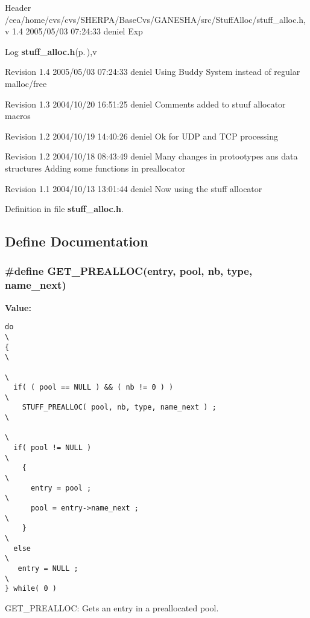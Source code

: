 \begin{Desc}
\item[Header]/cea/home/cvs/cvs/SHERPA/Base\-Cvs/GANESHA/src/Stuff\-Alloc/stuff\_\-alloc.h,v 1.4 2005/05/03 07:24:33 deniel Exp \end{Desc}


\begin{Desc}
\item[Log]{\bf stuff\_\-alloc.h}{\rm (p.\,\pageref{stuff__alloc_8h})},v \end{Desc}
Revision 1.4 2005/05/03 07:24:33 deniel Using Buddy System instead of regular malloc/free

Revision 1.3 2004/10/20 16:51:25 deniel Comments added to stuuf allocator macros

Revision 1.2 2004/10/19 14:40:26 deniel Ok for UDP and TCP processing

Revision 1.2 2004/10/18 08:43:49 deniel Many changes in protootypes ans data structures Adding some functions in preallocator

Revision 1.1 2004/10/13 13:01:44 deniel Now using the stuff allocator

Definition in file {\bf stuff\_\-alloc.h}.

\subsection{Define Documentation}
\subsubsection{\setlength{\rightskip}{0pt plus 5cm}\#define GET\_\-PREALLOC(entry, pool, nb, type, name\_\-next)}\label{stuff__alloc_8h_a2}


{\bf Value:}

\footnotesize\begin{verbatim}do                                                                        \
{                                                                         \
                                                                          \
  if( ( pool == NULL ) && ( nb != 0 ) )                                   \
    STUFF_PREALLOC( pool, nb, type, name_next ) ;                         \
                                                                          \
  if( pool != NULL )                                                      \
    {                                                                     \
      entry = pool ;                                                      \
      pool = entry->name_next ;                                           \
    }                                                                     \
  else                                                                    \
   entry = NULL ;                                                         \
} while( 0 )
\end{verbatim}\normalsize 
GET\_\-PREALLOC: Gets an entry in a preallocated pool.

